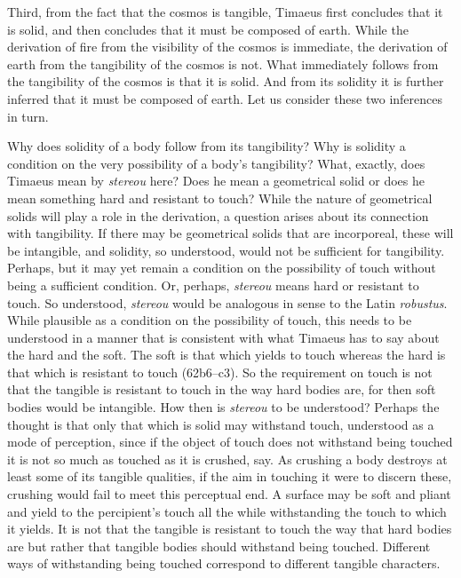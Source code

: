 Third, from the fact that the cosmos is tangible, Timaeus first concludes that it is solid, and then concludes that it must be composed of earth. While the derivation of fire from the visibility of the cosmos is immediate, the derivation of earth from the tangibility of the cosmos is not. What immediately follows from the tangibility of the cosmos is that it is solid. And from its solidity it is further inferred that it must be composed of earth. Let us consider these two inferences in turn. 

Why does solidity of a body follow from its tangibility? Why is solidity a condition on the very possibility of a body's tangibility? What, exactly, does Timaeus mean by \emph{stereou} here? Does he mean a geometrical solid or does he mean something hard and resistant to touch? While the nature of geometrical solids will play a role in the derivation, a question arises about its connection with tangibility. If there may be geometrical solids that are incorporeal, these will be intangible, and solidity, so understood, would not be sufficient for tangibility. Perhaps, but it may yet remain a condition on the possibility of touch without being a sufficient condition. Or, perhaps, \emph{stereou} means hard or resistant to touch. So understood, \emph{stereou} would be analogous in sense to the Latin \emph{robustus}. While plausible as a condition on the possibility of touch, this needs to be understood in a manner that is consistent with what Timaeus has to say about the hard and the soft. The soft is that which yields to touch whereas the hard is that which is resistant to touch (62b6–c3). So the requirement on touch is not that the tangible is resistant to touch in the way hard bodies are, for then soft bodies would be intangible. How then is \emph{stereou} to be understood? Perhaps the thought is that only that which is solid may withstand touch, understood as a mode of perception, since if the object of touch does not withstand being touched it is not so much as touched as it is crushed, say. As crushing a body destroys at least some of its tangible qualities, if the aim in touching it were to discern these, crushing would fail to meet this perceptual end. A surface may be soft and pliant and yield to the percipient's touch all the while withstanding the touch to which it yields. It is not that the tangible is resistant to touch the way that hard bodies are but rather that tangible bodies should withstand being touched. Different ways of withstanding being touched correspond to different tangible characters.

